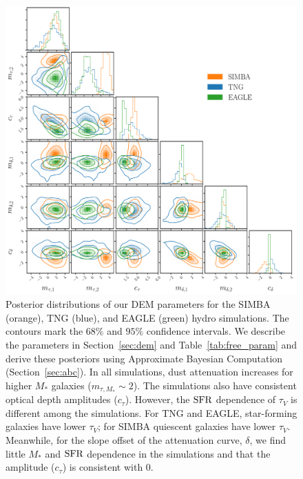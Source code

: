 \begin{figure}
\begin{center}
    \includegraphics[width=\textwidth]{figs/abc.pdf}
    \caption{\label{fig:abc}
    Posterior distributions of our DEM parameters for the SIMBA (orange), TNG
    (blue), and EAGLE (green) hydro simulations. The contours mark the $68\%$
    and $95\%$ confidence intervals. We describe the parameters in
    Section~\ref{sec:dem} and Table~\ref{tab:free_param} and derive these
    posteriors using Approximate Bayesian Computation (Section~\ref{sec:abc}). 
    In all simulations, dust attenuation increases for higher $M_*$ galaxies 
    ($m_{\tau,M_*} \sim 2$). The simulations also have consistent optical 
    depth amplitudes ($c_\tau$). However, the ${\rm SFR}$ dependence of
    $\tau_V$ is different among the simulations. For TNG and EAGLE,
    star-forming galaxies have lower $\tau_V$; for SIMBA quiescent galaxies
    have lower $\tau_V$. Meanwhile, for the slope offset of the attenuation
    curve, $\delta$, we find little $M_*$ and ${\rm SFR}$ dependence in the
    simulations and that the amplitude ($c_\tau$) is consistent with 0. 
    }
\end{center}
\end{figure}

